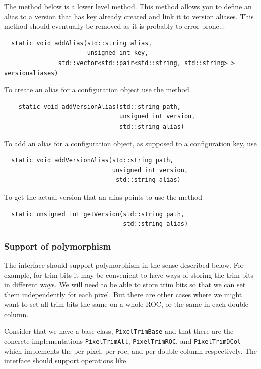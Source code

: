 The method below is a lower level method. This method
allows you to define an alias to a version that has key
already created and link it to version aliases. This method
should eventually be removed as it is probably to error prone...
\begin{verbatim}
  static void addAlias(std::string alias, 
                       unsigned int key,
		       std::vector<std::pair<std::string, std::string> > versionaliases)
\end{verbatim}

To create an alias for a configuration object use the method.
\begin{verbatim}
    static void addVersionAlias(std::string path, 
                                unsigned int version, 
                                std::string alias)
\end{verbatim}

To add an alias for a configuration object, as supposed to a
configuration key, use

\begin{verbatim}
  static void addVersionAlias(std::string path,
                              unsigned int version, 
                               std::string alias)
\end{verbatim}


To get the actual version that an alias points to use the method
\begin{verbatim}
  static unsigned int getVersion(std::string path,
                                 std::string alias)
\end{verbatim}

\subsubsection{Support of polymorphism}

The interface should support polymorphism in the sense described
below. For example, for trim bits it may be convenient to have ways of
storing the trim bits in different ways. We will need to be able 
to store trim bits so that we can set them independently for
each pixel. But there are other cases where we might want to set
all trim bits the same on a whole ROC, or the same in each 
double column.

Consider that we have a base class, {\tt PixelTrimBase} and that there
are the concrete implementations {\tt PixelTrimAll}, {\tt PixelTrimROC},
and {\tt PixelTrimDCol} which implements the per pixel, per roc, and
per double column respectively. The interface should support
operations like

